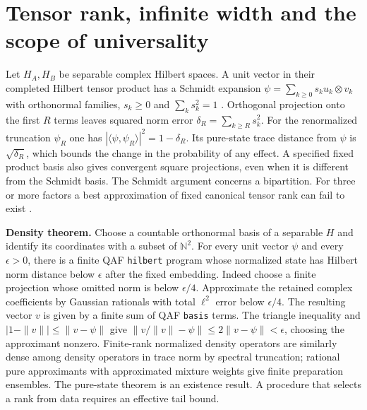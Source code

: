 \section{Tensor rank, infinite width and the scope of universality}
\label{sec:infinite}
Let $H_A,H_B$ be separable complex Hilbert spaces. A unit vector in their completed Hilbert tensor product has a Schmidt expansion $\psi=\sum_{k\ge0}s_k u_k\otimes v_k$ with orthonormal families, $s_k\ge0$ and $\sum_k s_k^2=1$ \cite{schmidt,cleve}. Orthogonal projection onto the first $R$ terms leaves squared norm error $\delta_R=\sum_{k\ge R}s_k^2$. For the renormalized truncation $\psi_R$ one has $|\langle\psi,\psi_R\rangle|^2=1-\delta_R$. Its pure-state trace distance from $\psi$ is $\sqrt{\delta_R}$, which bounds the change in the probability of any effect. A specified fixed product basis also gives convergent square projections, even when it is different from the Schmidt basis. The Schmidt argument concerns a bipartition. For three or more factors a best approximation of fixed canonical tensor rank can fail to exist \cite{tensorrank}.

\textbf{Density theorem.} Choose a countable orthonormal basis of a separable $H$ and identify its coordinates with a subset of $\mathbb N^2$. For every unit vector $\psi$ and every $\epsilon>0$, there is a finite QAF \texttt{hilbert} program whose normalized state has Hilbert norm distance below $\epsilon$ after the fixed embedding. Indeed choose a finite projection whose omitted norm is below $\epsilon/4$. Approximate the retained complex coefficients by Gaussian rationals with total $\ell^2$ error below $\epsilon/4$. The resulting vector $v$ is given by a finite sum of QAF \texttt{basis} terms. The triangle inequality and $|1-\|v\||\le\|v-\psi\|$ give $\|v/\|v\|-\psi\|\le2\|v-\psi\|<\epsilon$, choosing the approximant nonzero. Finite-rank normalized density operators are similarly dense among density operators in trace norm by spectral truncation; rational pure approximants with approximated mixture weights give finite preparation ensembles. The pure-state theorem is an existence result. A procedure that selects a rank from data requires an effective tail bound.

